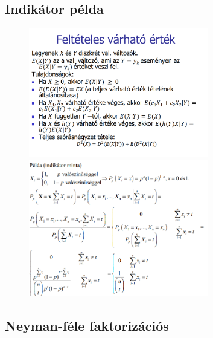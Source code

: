 \documentclass[12pt]{article}
\begin{document}
    \subsection{Indikátor példa}
    \begin{figure}[h]
        \centering
        \includegraphics[width=0.7\textwidth]{5.png}
        \includegraphics[width=0.7\textwidth]{6.png}
    \end{figure}

    \newpage
    \subsection{Neyman-féle faktorizációs}
\end{document}
